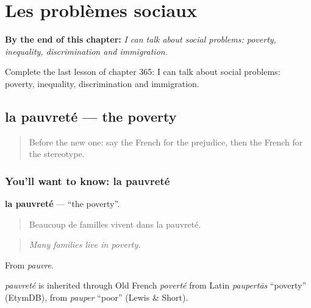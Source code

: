 
\chapter{Les problèmes sociaux}
\label{ch:fr-les-problemes-sociaux}

\begin{chapteropening}
\textbf{By the end of this chapter:} \emph{I can talk about social problems: poverty, inequality, discrimination and immigration.}

Complete the last lesson of chapter 365: I can talk about social problems: poverty, inequality, discrimination and immigration.
\end{chapteropening}

\section[la pauvreté]{la pauvreté — the poverty}

\label{lesson:FR-C365-pauvrete}



\begin{quote}
Before the new one: say the French for the prejudice, then the French for the stereotype.
\end{quote}

\subsection*{You'll want to know: la pauvreté}
\textbf{la pauvreté} — \textquotedblleft{}the poverty\textquotedblright{}.

\begin{quote}
Beaucoup de familles vivent dans la pauvreté.
\end{quote}

\begin{quote}
\emph{Many families live in poverty.}
\end{quote}

From \emph{pauvre}.

\begin{cousinweb}
\emph{pauvreté} is inherited through Old French \emph{poverté} from Latin \emph{paupertās} \textquotedblleft{}poverty\textquotedblright{} (EtymDB), from \emph{pauper} \textquotedblleft{}poor\textquotedblright{} (Lewis \& Short).
\end{cousinweb}

